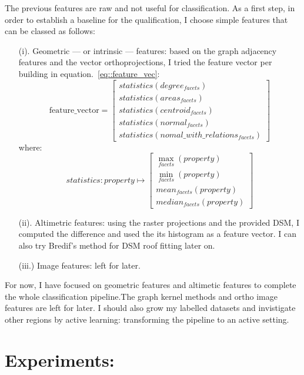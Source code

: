 \documentclass[a4paper, 11pt]{article}
\begin{document}
	The previous features are raw and not useful for classification. As a first
	step, in order to establish a baseline for the qualification, I choose simple
	features that can be classed as follows:
	\begin{itemize}
		\item[(i).] Geometric --- or intrinsic --- features: based on the graph adjacency features and the vector orthoprojections, I tried the feature vector per building in equation.~\ref{eq::feature_vec}:
		\begin{equation}\label{eq::feature_vec}
			\text{feature\_vector} = \begin{bmatrix}
				statistics(degree_{facets})\\
				statistics(areas_{facets})\\
				statistics(centroid_{facets})\\
				statistics(normal_{facets})\\
				statistics(nomal\_with\_relations_{facets})
		\end{bmatrix}
		\end{equation}
		where:
		\begin{equation}
			statistics: property \mapsto \begin{bmatrix}
			\max_{facets}(property)\\
			\min_{facets}(property)\\
			mean_{facets}(property)\\
			median_{facets}(property)
		\end{bmatrix}
		\end{equation}
		\item[(ii).] Altimetric features: using the raster projections and the provided DSM, I computed the difference and used the its histogram as a feature vector. I can also try Bredif's method for DSM roof fitting later on.
		\item[(iii.)] Image features: left for later.
	\end{itemize}

	For now, I have focused on geometric features and altimetic features to complete the whole classification pipeline.The graph kernel methods and ortho image features are left for later. I should also grow my labelled datasets and invistigate other regions by active learning: transforming the pipeline to an active setting.

	\section{Experiments:}
~\\
\end{document}
